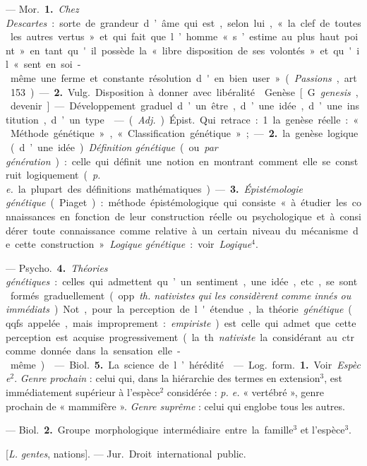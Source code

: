 \begin{itemize}[leftmargin=1cm, label=, itemsep=1pt]
 — \si{Mor.} {\bf 1.} {\it Chez Descartes} : sorte de grandeur
d’âme qui est, selon lui, « la clef de toutes les autres vertus » et qui fait
que l’homme « s’estime au plus haut point » en tant qu'il possède la « libre
disposition de ses volontés » et qu'il « sent en soi-même une ferme et
constante résolution d'en bien user » ({\it Passions}, art. 153). —
{\bf 2.} \si{Vulg.} Disposition à donner avec libéralité.

\ib{}Genèse [G. {\it genesis}, devenir] — Développement graduel d’un être,
d’une idée, d’une institution, d’un type.

 — ({\it Adj.}) \si{Épist.} Qui retrace : 1. la genèse réelle :
« Méthode génétique », « Classification génétique » ; — {\bf 2.} la genèse
logique (d’une idée). {\it Définition génétique} (ou {\it par génération}) :
celle qui définit une notion en montrant comment elle se construit
logiquement ({\it p. e.} la plupart
des définitions mathématiques). — {\bf 3.} {\it Épistémologie génétique}
(Piaget) : méthode épistémologique qui consiste « à étudier les connaissances
en fonction de leur construction réelle ou psychologique et à considérer
toute connaissance comme relative à un certain niveau du mécanisme de cette
construction ». {\it Logique génétique} : voir {\it Logique}$^4$.

— \si{Psycho.} {\bf 4.} {\it Théories génétiques} : celles qui admettent
qu’un sentiment, une idée, etc., se sont formés graduellement (opp.
{\it th. nativistes qui les considèrent comme innés ou immédiats}). Not.,
pour la perception de l'étendue, la théorie {\it génétique} (qqfs. appelée,
mais improprement : {\it empiriste}) est celle qui admet que cette perception
est acquise progressivement (la th. {\it nativiste} la considérant au ctr.
comme donnée dans la sensation elle-même).

 — \si{Biol.} {\bf 5.} La science de l’hérédité.

 — \si{Log.} \si{form.} {\bf 1.} Voir {\it Espèce}$^2$.
{\it Genre prochain} : celui qui, dans la hiérarchie des termes en
extension$^3$, est immédiatement supérieur à l’espèce$^2$ considérée :
{\it p. e.} « vertébré », genre prochain de « mammifère ».
{\it Genre suprême} : celui qui englobe tous les autres.

— \si{Biol.} {\bf 2.} Groupe morphologique intermédiaire entre la famille$^3$
et l'espèce$^3$.

 [{\it L.} {\it gentes}, nations].
— \si{Jur.} Droit international public.


\end{itemize}
